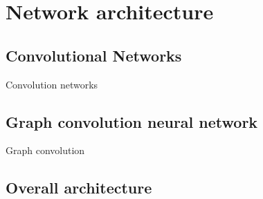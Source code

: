 \chapter{Network architecture}
\section{Convolutional Networks}
Convolution networks

\section{Graph convolution neural network}

Graph convolution

\section{Overall architecture}